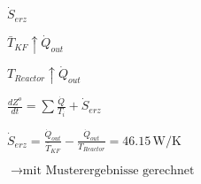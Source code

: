 \( \dot{S}_{erz} \)  

\( \bar{T}_{KF} \uparrow \dot{Q}_{out} \)  

\( T_{Reactor} \uparrow \dot{Q}_{out} \)  

\( \frac{dZ^o}{dt} = \sum \frac{\dot{Q}}{T_i} + \dot{S}_{erz} \)  

\( \dot{S}_{erz} = \frac{\dot{Q}_{out}}{\bar{T}_{KF}} - \frac{\dot{Q}_{out}}{T_{Reactor}} = 46.15 \, \text{W/K} \)  

\( \rightarrow \text{mit Musterergebnisse gerechnet} \)